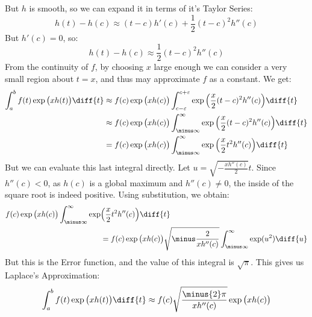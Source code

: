         But $h$ is smooth, so we can expand it in terms of it's
        Taylor Series:
        \begin{equation}
            h(t)-h(c)\approx(t-c)h'(c)+\frac{1}{2}(t-c)^{2}h''(c)
        \end{equation}
        But $h'(c)=0$, so:
        \begin{equation}
            h(t)-h(c)\approx\frac{1}{2}(t-c)^{2}h''(c)
        \end{equation}
        From the continuity of $f$, by choosing $x$ large enough we
        can consider a very small region about $t=x$, and thus may
        approximate $f$ as a constant. We get:
        \begin{subequations}
            \begin{align}
                \int_{a}^{b}f(t)\exp\big(xh(t)\big)\diff{t}
                &\approx{f}(c)\exp\big(xh(c)\big)
                    \int_{c-\varepsilon}^{c+\varepsilon}
                    \exp\Big(\frac{x}{2}(t-c)^{2}h''(c)\Big)\diff{t}\\
                &\approx{f}(c)\exp\big(xh(c)\big)
                    \int_{\minus\infty}^{\infty}
                    \exp\Big(\frac{x}{2}(t-c)^{2}h''(c)\Big)\diff{t}\\
                &=f(c)\exp\big(xh(c)\big)\int_{\minus\infty}^{\infty}
                    \exp\Big(\frac{x}{2}t^{2}h''(c)\Big)\diff{t}
            \end{align}
        \end{subequations}
        But we can evaluate this last integral directly. Let
        $u=\sqrt{\minus\frac{xh''(c)}{2}}t$. Since $h''(c)<0$, as
        $h(c)$ is a global maximum and $h''(c)\ne{0}$, the inside of
        the square root is indeed positive. Using substitution, we
        obtain:
        \begin{equation}
            \begin{split}
                f(c)\exp\big(xh(c)\big)\int_{\minus\infty}^{\infty}
                    \exp&\Big(\frac{x}{2}t^{2}h''(c)\Big)\diff{t}\\
                &=f(c)\exp\big(xh(c)\big)
                \sqrt{\minus\frac{2}{xh''(c)}}
                \int_{\minus\infty}^{\infty}\exp(u^{2})\diff{u}
            \end{split}
        \end{equation}
        But this is the Error function, and the value of this integral
        is $\sqrt{\pi}$. This gives us Laplace's Approximation:
        \begin{equation}
            \int_{a}^{b}f(t)\exp\big(xh(t)\big)\diff{t}
            \approx{f}(c)\sqrt{\frac{\minus{2}\pi}{xh''(c)}}
            \exp\big(xh(c)\big)
        \end{equation}
